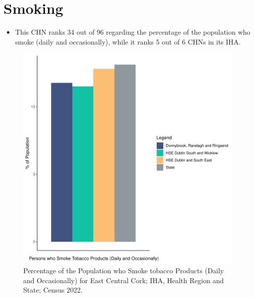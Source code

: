 \documentclass{article}
\begin{document}
\pagebreak

\section{Smoking}\label{sect:Smoking}
\begin{itemize}
\item This CHN ranks  34 out of 96 regarding the percentage of the population who smoke (daily and occasionally), while it ranks   5 out of 6 CHNs in its IHA.
\end{itemize}
\begin{figure}[H]
	\centering
	\includegraphics[width = 120mm]{../figures/SmokingED.pdf}
	\caption{Percentage of the Population who Smoke tobacco Products (Daily and Occasionally) for East Central Cork; IHA, Health Region and State; Census 2022.}
	\label{fig:2ae19629-1a6a-13a3-e055-000000000001}
	\end{figure}
	
\end{document}
